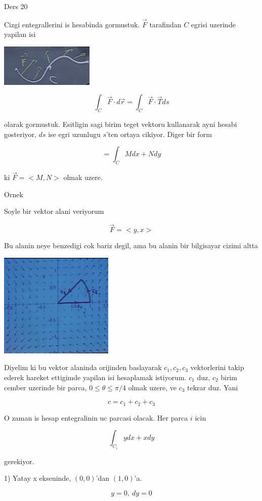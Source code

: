 \documentclass[12pt,fleqn]{article}\usepackage{../common}
\begin{document}
Ders 20

Cizgi entegrallerini is hesabinda gormustuk. $\vec{F}$ tarafindan $C$
egrisi uzerinde yapilan isi

\includegraphics[height=2cm]{20_1.png}

\[ \int_C \vec{F} \cdot d\vec{r} =  \int_C \vec{F} \cdot \vec{T} ds \]

olarak gormustuk. Esitligin sagi birim teget vektoru kullanarak ayni hesabi
gosteriyor, $ds$ ise egri uzunlugu $s$'ten ortaya cikiyor. Diger bir form

\[ = \int_C M dx + N dy \]

ki $\vec{F} = <M,N>$ olmak uzere. 

Ornek 

Soyle bir vektor alani veriyorum

\[ \vec{F} = <y,x> \]

Bu alanin neye benzedigi cok bariz degil, ama bu alanin bir bilgisayar
cizimi altta

\includegraphics[height=5cm]{20_2.png}

Diyelim ki bu vektor alaninda orijinden baslayarak $c_1,c_2,c_3$
vektorlerini takip ederek hareket ettigimde yapilan isi hesaplamak
istiyorum. $c_1$ duz, $c_2$ birim cember uzerinde bir parca, $0 \le \theta
\le \pi / 4$ 
olmak uzere, ve $c_3$ tekrar duz. Yani 

\[ c = c_1 + c_2 + c_3 \]

O zaman is hesap entegralinin uc parcasi olacak. Her parca $i$ icin 

\[ \int_{C_i} y dx + x dy\]

gerekiyor. 

1) Yatay x ekseninde, $(0,0)$'dan $(1,0)$'a. 

\[ y = 0, \ dy = 0 \]
\end{document}
